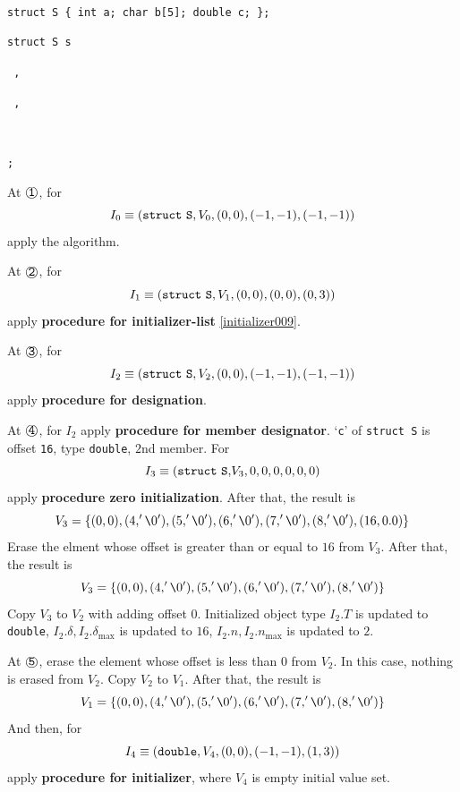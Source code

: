 \begin{Example}

\

{\tt struct S \{ int a; char b[5]; double c; \};}

{\tt struct S s  
}

{\tt
{}
,
}

{\tt
{}
,
}

{\tt
{}
}

{\tt {};}

\noindent
At $\MARU{\tt 1}$, for
\[
I_0 \equiv ({\tt{struct\,\,S}}, V_0, (0,0),(-1,-1),(-1,-1))
\]
apply the algorithm.


\noindent
At $\MARU{\tt 2}$, for
\[
I_1 \equiv ({\tt{struct\,\,S}},V_1,(0,0),(0,0),(0,3)) 
\]
apply  {\bf procedure for initializer-list} \ref{initializer009}.

\noindent
At $\MARU{\tt 3}$, for
\[
I_2 \equiv ({\tt struct\,\,S}, V_2, (0,0), (-1,-1),(-1,-1))
\]
apply
{\bf procedure for designation}.

\noindent
At $\MARU{\tt 4}$, for $I_2$ apply
{\bf procedure for member designator}.
`{\tt c}' of {\tt struct S} is offset {\tt{16}}, 
type  {\tt double}, $2$nd member.
For
\[
 I_3 \equiv ({\tt{struct\,\,S},}V_3,0,0,0,0,0,0)
\]
apply {\bf procedure zero initialization}.
After that, the result is
\[
 V_3 = \{ (0,0), (4,'\verb|\|0'), (5,'\verb|\|0'), (6,'\verb|\|0'),
           (7,'\verb|\|0'), (8,'\verb|\|0'), (16,0.0)    \}
\]
Erase the elment whose offset is greater than or equal to $16$ from $V_3$.
After that, the result is
\[
 V_3 = \{ (0,0), (4,'\verb|\|0'), (5,'\verb|\|0'), (6,'\verb|\|0'),
           (7,'\verb|\|0'), (8,'\verb|\|0')  \}
\]
Copy $V_3$ to $V_2$ with adding offset $0$.
Initialized object type $I_2.T$ is updated to {\tt{double}},
$I_2.{\delta}, I_2.{\delta}_{\max}$ is updated to $16$,
$I_2.n, I_2.n_{\max}$ is updated to $2$.

\noindent
At $\MARU{\tt 5}$, erase the element whose offset is less than 0 from
 $V_2$.
In this case, nothing is erased from $V_2$.
Copy $V_2$ to $V_1$. After that, the result is
\[
V_1 = \{ (0,0), (4,'\verb|\|0'), (5,'\verb|\|0'), (6,'\verb|\|0'),
        (7,'\verb|\|0'), (8,'\verb|\|0')    \}
\]
And then, for
\[
I_4 \equiv ({\tt{double}}, V_4, (0,0), (-1,-1), (1,3))
\]
apply {\bf procedure for initializer}, where $V_4$ is empty initial
value set.


\end{Example}
